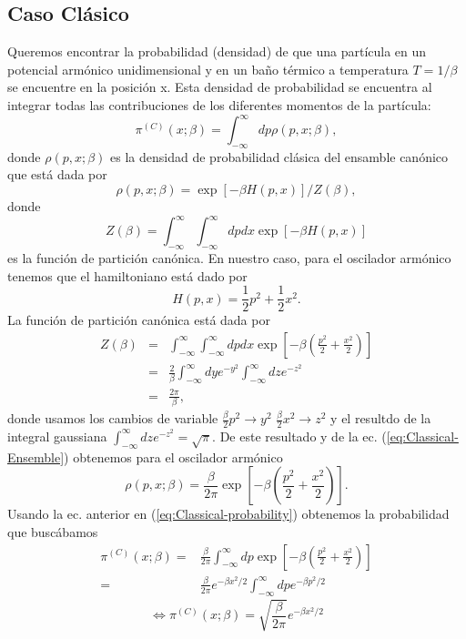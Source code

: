 \documentclass[%
 reprint,
 amsmath,amssymb,
 aps,
 pra,
]{revtex4-2}
\begin{document}
\subsection{Caso Clásico} \label{subsec:caso-clasico}
Queremos encontrar la probabilidad (densidad) de que una partícula en un potencial armónico unidimensional y en un baño térmico a temperatura $T = 1/\beta$ se encuentre en la posición x. Esta densidad de probabilidad se encuentra al integrar todas las contribuciones de los diferentes momentos de la partícula:
\begin{equation}
\pi^{(C)}(x;\beta) = \int_{-\infty}^\infty dp \rho(p,x;\beta),  \label{eq:Classical-probability}
\end{equation}
donde $\rho(p,x;\beta)$ es la densidad de probabilidad clásica del ensamble canónico que está dada por
\begin{equation}
\rho(p,x;\beta) = \exp[-\beta H(p,x)] / Z(\beta) ,  \label{eq:Classical-Ensemble}
\end{equation}
donde
\begin{equation}
Z(\beta) = \int_{-\infty}^\infty \int_{-\infty}^\infty dp dx \exp[-\beta H(p,x)]
\end{equation} 
es la función de partición canónica.
En nuestro caso, para el oscilador armónico tenemos que el hamiltoniano está dado por
\begin{equation}
H(p,x) = \frac{1}{2} p^2 + \frac{1}{2} x^2. \label{eq:Classical-Hamiltonian}
\end{equation}
La función de partición canónica está dada por
\begin{eqnarray}
Z(\beta) 	&=& \int_{-\infty}^\infty \int_{-\infty}^\infty dp dx \exp[-\beta \left( \frac{p^2}{2} + \frac{x^2}{2} \right) ] \\ 
			&=& \frac{2}{\beta} \int_{-\infty}^\infty dy e^{-y^2} \int_{-\infty}^\infty dz e^{-z^2} \nonumber \\
			&=& \frac{2\pi}{\beta},
\end{eqnarray}
donde usamos los cambios de variable $\frac{\beta}{2}p^2 \rightarrow y^2$ $\frac{\beta}{2}x^2 \rightarrow z^2$ y el resultdo de la integral gaussiana $\int_{-\infty}^\infty dz e^{-z^2} = \sqrt{\pi}$. De este resultado y de la ec. (\ref{eq:Classical-Ensemble}) obtenemos para el oscilador armónico
\begin{equation}
\rho(p,x;\beta) = \frac{\beta}{2\pi} \exp[-\beta \left( \frac{p^2}{2} + \frac{x^2}{2} \right) ] \label{eq:HO-Classical-Ensemble}.
\end{equation}
Usando la ec. anterior en (\ref{eq:Classical-probability}) obtenemos la probabilidad que buscábamos 
\begin{align}
\pi^{(C)}(x;\beta) =& \frac{\beta}{2\pi}\int_{-\infty}^\infty dp \exp[-\beta \left( \frac{p^2}{2} + \frac{x^2}{2} \right)] \nonumber \\
=&\frac{\beta}{2\pi}e^{-\beta x^2/2}
\int_{-\infty}^\infty dp e^{-\beta p^2/2} \nonumber
\end{align}
\begin{equation}
\!\!\!\!\!\!\!\!\!\!\!\!\!\!\!\!\!\!\!\!\!\!\! \iff \pi^{(C)}(x;\beta) = \sqrt{\frac{\beta}{2\pi}}e^{-\beta x^2/2} \label{eq:pi-classical-finale}
\end{equation}
\end{document}
